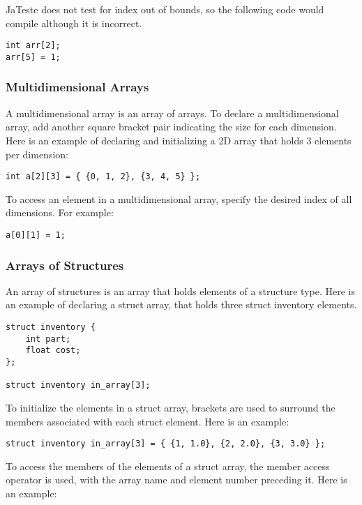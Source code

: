 \documentclass{article}
\begin{document}
JaTeste does not test for index out of bounds, so the following code would compile although it is incorrect. 

 \begin{lstlisting}
int arr[2];
arr[5] = 1;
\end{lstlisting}


\subsubsection{Multidimensional Arrays}
A multidimensional array is an array of arrays. To declare a multidimensional array, add another square bracket pair indicating the size for each dimension. Here is an example of declaring and initializing a 2D array that holds 3 elements per dimension:

 \begin{lstlisting}
int a[2][3] = { {0, 1, 2}, {3, 4, 5} };
\end{lstlisting}

To access an element in a multidimensional array, specify the desired index of all dimensions. For example:

 \begin{lstlisting}
a[0][1] = 1;
\end{lstlisting}

\subsubsection{Arrays of Structures}
An array of structures is an array that holds elements of a structure type. Here is an example of declaring a struct array, that holds three struct inventory elements. 

 \begin{lstlisting}
struct inventory {
	int part;
	float cost;
};

struct inventory in_array[3];

\end{lstlisting}

To initialize the elements in a struct array, brackets are used to surround the members associated with each struct element. Here is an example:

 \begin{lstlisting}
struct inventory in_array[3] = { {1, 1.0}, {2, 2.0}, {3, 3.0} };
\end{lstlisting}

To access the members of the elements of a struct array, the member access operator is used, with the array name and element number preceding it. Here is an example:
\end{document}
